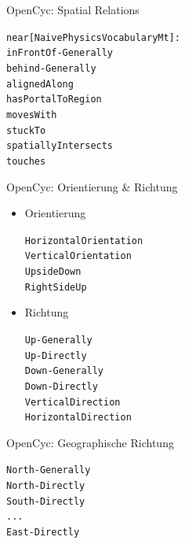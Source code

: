 \documentclass[12pt,a4paper]{beamer}
\begin{document}
\begin{frame}{OpenCyc: Spatial Relations}
\begin{alltt}
near[NaivePhysicsVocabularyMt]:\\
    inFrontOf-Generally\\
    behind-Generally\\
    alignedAlong\\
    hasPortalToRegion\\
    movesWith\\
    stuckTo\\
    spatiallyIntersects\\
    touches\\
\end{alltt}

\end{frame}



\begin{frame}{OpenCyc: Orientierung \& Richtung}
\begin{itemize}
\item Orientierung\\
\begin{alltt}
    HorizontalOrientation\\
    VerticalOrientation\\
    UpsideDown\\
    RightSideUp
\end{alltt}
\item Richtung
\begin{alltt}
    Up-Generally\\
    Up-Directly\\
    Down-Generally\\
    Down-Directly\\
    VerticalDirection\\
    HorizontalDirection
\end{alltt}
\end{itemize}
\end{frame}



\begin{frame}{OpenCyc: Geographische Richtung}
\begin{alltt}
    North-Generally\\
    North-Directly\\
    South-Directly\\
    ...\\
    East-Directly
\end{alltt}
\end{frame}
\end{document}
